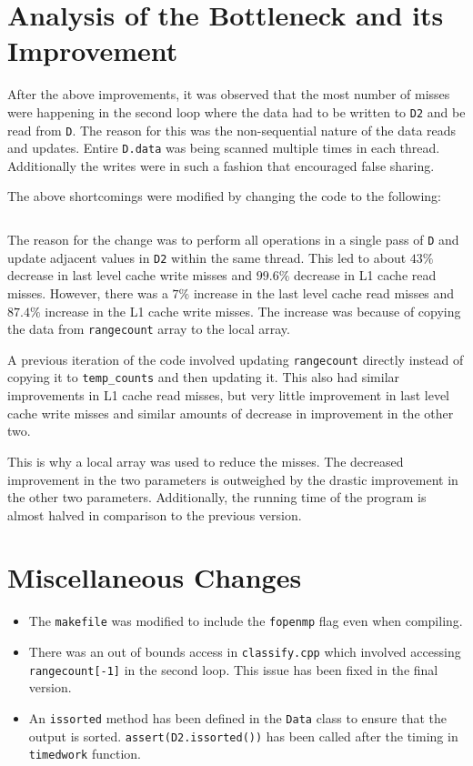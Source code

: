 \documentclass[11pt]{article}
\begin{document}
\section{Analysis of the Bottleneck and its Improvement}
After the above improvements, it was observed that the most number of misses were happening in the second loop where the data had to be written to \texttt{D2} and be read from \texttt{D}. The reason for this was the non-sequential nature of the data reads and updates. Entire \texttt{D.data} was being scanned multiple times in each thread. Additionally the writes were in such a fashion that encouraged false sharing.\par
The above shortcomings were modified by changing the code to the following:
\inputminted[firstline=50,lastline=62,bgcolor=mintedbg,linenos]{c++}{classify.cpp}
The reason for the change was to perform all operations in a single pass of \texttt{D} and update adjacent values in \texttt{D2} within the same thread. This led to about $43\%$ decrease in last level cache write misses and $99.6\%$ decrease in L1 cache read misses. However, there was a $7\%$ increase in the last level cache read misses and $87.4\%$ increase in the L1 cache write misses. The increase was because of copying the data from \texttt{rangecount} array to the local array.\par
A previous iteration of the code involved updating \texttt{rangecount} directly instead of copying it to \texttt{temp\_counts} and then updating it. This also had similar improvements in L1 cache read misses, but very little improvement in last level cache write misses and similar amounts of decrease in improvement in the other two.\par
This is why a local array was used to reduce the misses. The decreased improvement in the two parameters is outweighed by the drastic improvement in the other two parameters. Additionally, the running time of the program is almost halved in comparison to the previous version.

\section{Miscellaneous Changes}
\begin{itemize}
	\item The \texttt{makefile} was modified to include the \texttt{fopenmp} flag even when compiling.
	\item There was an out of bounds access in \texttt{classify.cpp} which involved accessing \texttt{rangecount[-1]} in the second loop. This issue has been fixed in the final version.
	\item An \texttt{issorted} method has been defined in the \texttt{Data} class to ensure that the output is sorted. \texttt{assert(D2.issorted())} has been called after the timing in \texttt{timedwork} function.
\end{itemize}
\end{document}

